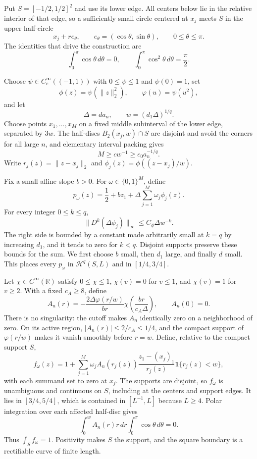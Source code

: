 Put \(S=[-1/2,1/2]^2\) and use its lower edge.  All centers below lie in the relative interior of that edge, so a sufficiently small circle centered at \(x_j\) meets \(S\) in the upper half-circle
\[
 x_j+r e_\theta,\qquad e_\theta=(\cos\theta,\sin\theta),
 \qquad 0\leq\theta\leq\pi.
\]
The identities that drive the construction are
\[
 \int_0^\pi\cos\theta\,d\theta=0,
 \qquad
 \int_0^\pi\cos^2\theta\,d\theta=\frac\pi2.
\]

Choose \(\psi\in C_c^\infty((-1,1))\) with \(0\leq\psi\leq1\) and \(\psi(0)=1\), set
\[
 \phi(z)=\psi(\lVert z\rVert_2^2),
 \qquad \varphi(u)=\psi(u^2),
\]
and let
\[
 \Delta=d a_n,
 \qquad w=(d_1\Delta)^{1/q}.
\]
Choose points \(x_1,\ldots,x_M\) on a fixed middle subinterval of the lower edge, separated by \(3w\).  The half-discs \(B_2(x_j,w)\cap S\) are disjoint and avoid the corners for all large \(n\), and elementary interval packing gives
\[
 M\geq c w^{-1}\geq c_0a_n^{-1/q}.
\]
Write \(r_j(z)=\lVert z-x_j\rVert_2\) and \(\phi_j(z)=\phi((z-x_j)/w)\).

Fix a small affine slope \(b>0\).  For \(\omega\in\{0,1\}^M\), define
\[
 p_\omega(z)=\frac12+bz_1+\Delta\sum_{j=1}^M\omega_j\phi_j(z).
\]
For every integer \(0\leq k\leq q\),
\[
 \lVert D^k(\Delta\phi_j)\rVert_\infty
 \leq C_\phi\Delta w^{-k}.
\]
The right side is bounded by a constant made arbitrarily small at \(k=q\) by increasing \(d_1\), and it tends to zero for \(k<q\).  Disjoint supports preserve these bounds for the sum.  We first choose \(b\) small, then \(d_1\) large, and finally \(d\) small.  This places every \(p_\omega\) in \(\mathcal H^q(S,L)\) and in \([1/4,3/4]\).

Let \(\chi\in C^\infty(\mathbb R)\) satisfy \(0\leq\chi\leq1\), \(\chi(v)=0\) for \(v\leq1\), and \(\chi(v)=1\) for \(v\geq2\).  With a fixed \(c_A\geq8\), define
\[
 A_n(r)=-\frac{2\Delta\varphi(r/w)}{br}
 \chi\!\left(\frac{br}{c_A\Delta}\right),
 \qquad A_n(0)=0.
\]
There is no singularity: the cutoff makes \(A_n\) identically zero on a neighborhood of zero.  On its active region, \(|A_n(r)|\leq2/c_A\leq1/4\), and the compact support of \(\varphi(r/w)\) makes it vanish smoothly before \(r=w\).  Define, relative to the compact support \(S\),
\[
 f_\omega(z)=1+\sum_{j=1}^M\omega_j A_n(r_j(z))
 \frac{z_1-(x_j)_1}{r_j(z)}\mathbf1\{r_j(z)<w\},
\]
with each summand set to zero at \(x_j\).  The supports are disjoint, so \(f_\omega\) is unambiguous and continuous on \(S\), including at the centers and support edges.  It lies in \([3/4,5/4]\), which is contained in \([L^{-1},L]\) because \(L\geq4\).  Polar integration over each affected half-disc gives
\[
 \int_0^w A_n(r)r\,dr\int_0^\pi\cos\theta\,d\theta=0.
\]
Thus \(\int_S f_\omega=1\).  Positivity makes \(S\) the support, and the square boundary is a rectifiable curve of finite length.

